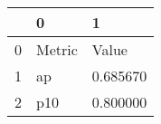 \begin{tabular}{lll}
\toprule
 & 0 & 1 \\
\midrule
0 & Metric & Value \\
1 & ap & 0.685670 \\
2 & p10 & 0.800000 \\
\bottomrule
\end{tabular}
